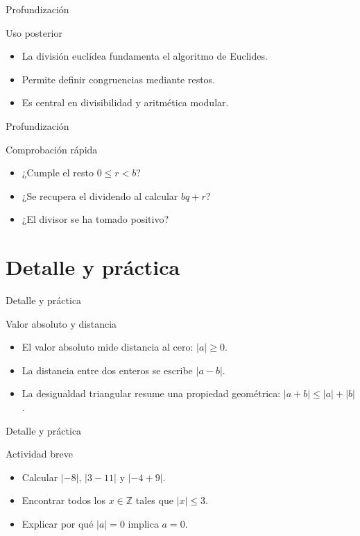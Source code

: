 \documentclass[aspectratio=169,11pt]{beamer}
\begin{document}
\begin{frame}{Profundización}
\begin{block}{Uso posterior}
\begin{itemize}
  \item La división euclídea fundamenta el algoritmo de Euclides.
  \item Permite definir congruencias mediante restos.
  \item Es central en divisibilidad y aritmética modular.
\end{itemize}
\end{block}
\end{frame}

\begin{frame}{Profundización}
\begin{block}{Comprobación rápida}
\begin{itemize}
  \item ¿Cumple el resto \(0\leq r<b\)?
  \item ¿Se recupera el dividendo al calcular \(bq+r\)?
  \item ¿El divisor se ha tomado positivo?
\end{itemize}
\end{block}
\end{frame}


\section{Detalle y práctica}

\begin{frame}{Detalle y práctica}
\begin{block}{Valor absoluto y distancia}
\begin{itemize}
  \item El valor absoluto mide distancia al cero: \(|a|\geq 0\).
  \item La distancia entre dos enteros se escribe \(|a-b|\).
  \item La desigualdad triangular resume una propiedad geométrica: \(|a+b|\leq |a|+|b|\).
\end{itemize}
\end{block}
\end{frame}

\begin{frame}{Detalle y práctica}
\begin{block}{Actividad breve}
\begin{itemize}
  \item Calcular \(|-8|\), \(|3-11|\) y \(|-4+9|\).
  \item Encontrar todos los \(x\in\mathbb{Z}\) tales que \(|x|\leq 3\).
  \item Explicar por qué \(|a|=0\) implica \(a=0\).
\end{itemize}
\end{block}
\end{frame}
\end{document}
